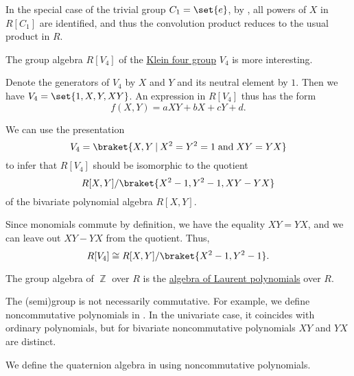 \begin{example}
\begin{thmenum}
     In the special case of the trivial group \( C_1 = \set{ e } \), by , all powers of \( X \) in \( R[C_1] \) are identified, and thus the convolution product reduces to the usual product in \( R \).

     The group algebra \( R[V_4] \) of the \hyperref[def:klein_four_group]{Klein four group} \( V_4 \) is more interesting.

    Denote the generators of \( V_4 \) by \( X \) and \( Y \) and its neutral element by \( 1 \). Then we have \( V_4 = \set{ 1, X, Y, XY } \). An expression in \( R[V_4] \) thus has the form
    \begin{equation*}
      f(X, Y) = aXY + bX + cY + d.
    \end{equation*}

    We can use the presentation
    \begin{equation*}
      V_4 = \braket{ X, Y \given X^2 = Y^2 = 1 \T{and} XY = YX }
    \end{equation*}
    to infer that \( R[V_4] \) should be isomorphic to the quotient
    \begin{equation*}
      R[X, Y] / \braket{ X^2 - 1, Y^2 - 1, XY - YX }
    \end{equation*}
    of the bivariate polynomial algebra \( R[X, Y] \).

    Since monomials commute by definition, we have the equality \( XY = YX \), and we can leave out \( XY - YX \) from the quotient. Thus,
    \begin{equation*}
      R[V_4] \cong R[X, Y] / \braket{ X^2 - 1, Y^2 - 1 }.
    \end{equation*}

     The group algebra of \( \BbbZ \) over \( R \) is the \hyperref[def:laurent_polynomial_algebra]{algebra of Laurent polynomials} over \( R \).

     The (semi)group is not necessarily commutative. For example, we define noncommutative polynomials in . In the univariate case, it coincides with ordinary polynomials, but for bivariate noncommutative polynomials \( XY \) and \( YX \) are distinct.

    We define the quaternion algebra in  using noncommutative polynomials.
  \end{thmenum}
\end{example}


